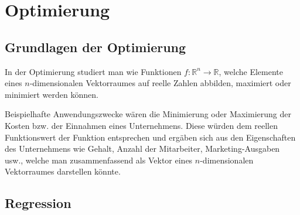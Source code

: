 \section{Optimierung}
\subsection{Grundlagen der Optimierung}
In der Optimierung studiert man wie Funktionen $f: \mathbb{R}^n \rightarrow \mathbb{R}$, welche Elemente eines $n$-dimensionalen Vektorraumes auf reelle Zahlen abbilden, maximiert oder minimiert werden können.

Beispielhafte Anwendungszwecke wären die Minimierung oder Maximierung der Kosten bzw. der Einnahmen eines Unternehmens. Diese würden dem reellen Funktionswert der Funktion entsprechen und ergäben sich aus den Eigenschaften des Unternehmens wie Gehalt, Anzahl der Mitarbeiter, Marketing-Ausgaben usw., welche man zusammenfassend als Vektor eines $n$-dimensionalen Vektorraumes darstellen könnte.

\subsection{Regression}

